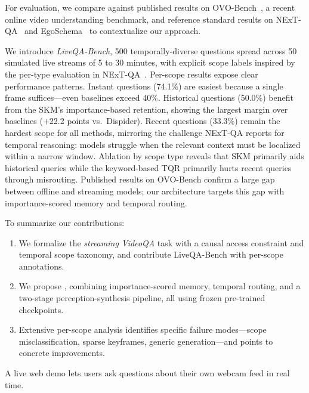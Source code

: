 For evaluation, we compare against published results on OVO-Bench~\cite{li2025ovobench}, a recent online video understanding benchmark, and reference standard results on NExT-QA~\cite{xiao2021nextqa} and EgoSchema~\cite{mangalam2023egoschema} to contextualize our approach.

We introduce \emph{LiveQA-Bench}, 500 temporally-diverse questions spread across 50 simulated live streams of 5 to 30 minutes, with explicit scope labels inspired by the per-type evaluation in NExT-QA~\cite{xiao2021nextqa}.
Per-scope results expose clear performance patterns.
Instant questions (74.1\%) are easiest because a single frame suffices---even baselines exceed 40\%.
Historical questions (50.0\%) benefit from the SKM's importance-based retention, showing the largest margin over baselines ($+$22.2 points vs.\ Dispider).
Recent questions (33.3\%) remain the hardest scope for all methods, mirroring the challenge NExT-QA reports for temporal reasoning: models struggle when the relevant context must be localized within a narrow window.
Ablation by scope type reveals that SKM primarily aids historical queries while the keyword-based TQR primarily hurts recent queries through misrouting.
Published results on OVO-Bench confirm a large gap between offline and streaming models; our architecture targets this gap with importance-scored memory and temporal routing.

To summarize our contributions:
\begin{enumerate}[leftmargin=*,itemsep=1pt]
  \item We formalize the \emph{streaming VideoQA} task with a causal access constraint and temporal scope taxonomy, and contribute LiveQA-Bench with per-scope annotations.
  \item We propose \ours, combining importance-scored memory, temporal routing, and a two-stage perception-synthesis pipeline, all using frozen pre-trained checkpoints.
  \item Extensive per-scope analysis identifies specific failure modes---scope misclassification, sparse keyframes, generic generation---and points to concrete improvements.
\end{enumerate}

A live web demo lets users ask questions about their own webcam feed in real time.
